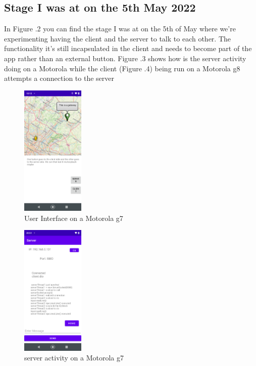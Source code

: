 \documentclass[a4paper,12pt]{article}
\begin{document}
\subsection{Stage I was at on the 5th May 2022}
In Figure .2 you can find the stage I was at on the 5th of May where we're experimenting having the client and the server to talk to each other. The functionality it's still incapsulated in the client and needs to become part of the app rather than an external button. Figure .3 shows how is the server activity doing on a Motorola while the client (Figure .4) being run on a Motorola g8 attempts a connection to the server
\begin{figure}
\includegraphics[width=3cm]{./current_status_g7.PNG}
\caption{User Interface on a Motorola g7}\label{wrap-fig:2}
\end{figure}

\begin{figure}
\includegraphics[width=3cm]{./server_g7.PNG}
\caption{server activity on a Motorola g7}\label{wrap-fig:3}
\end{figure}
\end{document}
